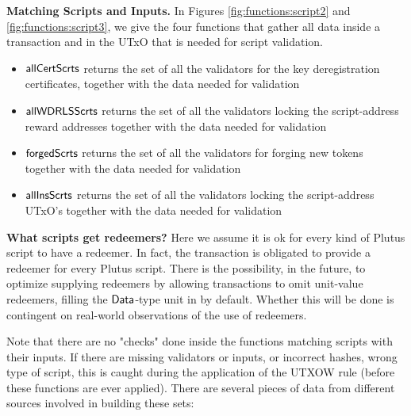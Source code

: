 \textbf{Matching Scripts and Inputs.}
In Figures \ref{fig:functions:script2} and \ref{fig:functions:script3},
we give the four functions that gather all data inside a transaction
and in the UTxO that is needed for script validation.

\begin{itemize}
\item $\mathsf{allCertScrts}$ returns the set of all the validators for the
key deregistration certificates, together
with the data needed for validation
\item $\mathsf{allWDRLSScrts}$ returns the set of all the validators locking
the script-address reward addresses together
with the data needed for validation
\item $\mathsf{forgedScrts}$ returns the set of all the validators for
forging new tokens together
with the data needed for validation
\item $\mathsf{allInsScrts}$ returns the set of all the validators locking
the script-address UTxO's together
with the data needed for validation
\end{itemize}


\textbf{What scripts get redeemers?}
Here we assume it is ok for every kind of Plutus script to
have a redeemer. In fact, the transaction is obligated to provide a redeemer for
every Plutus script. There is the possibility, in the future, to optimize supplying redeemers
by allowing transactions to omit unit-value redeemers, filling the $\mathsf{Data}$-type
unit in by default. Whether this will be done is contingent on real-world
observations of the use of redeemers.

Note that there are no "checks" done inside the functions matching
scripts with their inputs. If there are
missing validators or inputs, or incorrect hashes, wrong type of script,
this is caught during the application of the UTXOW
rule (before these functions are ever applied).
There are several pieces of data from different sources involved in building these
sets:

